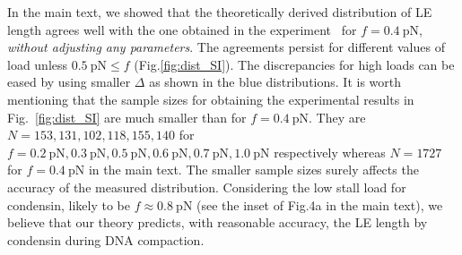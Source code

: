 \documentclass[aps,preprint]{revtex4-1}
\newcommand{\pN}{\ \mathrm{pN}}
\newcommand{\nm}{\ \mathrm{nm}}
\newcommand{\vR}{R}
\newcommand{\vL}{L}
\begin{document}
In the main text, we showed that the theoretically derived distribution of LE length agrees well with the one obtained in the experiment~\cite{ryu2020resolving} for $f=0.4\pN$, {\it without adjusting any parameters}. The agreements persist for different values of load unless $0.5\pN \leq f$ (Fig.\ref{fig:dist_SI}). The discrepancies for high loads can be eased by using smaller $\Delta$ as shown in the blue distributions. It is worth mentioning that the sample sizes for obtaining the experimental results in Fig.~\ref{fig:dist_SI} are much smaller than for  $f=0.4\pN$.  They are $N=153,131,102,118,155,140$ for $f=0.2\pN,0.3\pN,0.5\pN,0.6\pN,0.7\pN,1.0\pN$ respectively whereas $N=1727$ for $f=0.4\pN$ in the main text. The smaller sample sizes surely affects the accuracy of the measured distribution. Considering the low stall load for condensin, likely to be $f \approx 0.8 \pN$ (see the inset of Fig.4a in the main text),  we believe that our theory predicts, with reasonable accuracy, the LE length by condensin during DNA compaction. 

\end{document}
